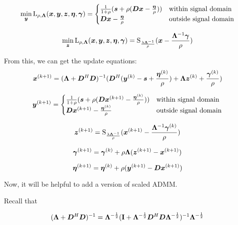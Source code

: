 \documentclass{article}
\begin{document}
\begin{equation}
\min_{\bm{y}} \operatorname{L}_{\rho,\bm{\Lambda}}(\bm{x},\bm{y},\bm{z},\bm{\eta},\bm{\gamma}) = \begin{cases}
\frac{1}{1 + \rho}(\bm{s} + \rho(\bm{D}\bm{x} - \frac{\bm{\eta}}{\rho})) & \text{within signal domain}\\
\bm{D}\bm{x} - \frac{\bm{\eta}}{\rho} & \text{outside signal domain}
\end{cases}
\end{equation}

\begin{equation}
\min_{\bm{z}} \operatorname{L}_{\rho,\bm{\Lambda}}(\bm{x},\bm{y},\bm{z},\bm{\eta},\bm{\gamma}) = \operatorname{S}_{\frac{\lambda\bm{\Lambda}^{-1}}{\rho}}(\bm{x} - \frac{\bm{\Lambda}^{-1}\bm{\gamma}}{\rho})
\end{equation}

From this, we can get the update equations:
\begin{equation}
\bm{x}^{(k + 1)} = (\bm{\Lambda} + \bm{D}^H\bm{D})^{-1}(\bm{D}^H(\bm{y}^{(k)} - \bm{s} + \frac{\bm{\eta}^{(k)}}{\rho}) + \bm{\Lambda}\bm{z}^{(k)} + \frac{\bm{\gamma}^{(k)}}{\rho})
\end{equation}

\begin{equation}
\bm{y}^{(k + 1)}= \begin{cases}
\frac{1}{1 + \rho}(\bm{s} + \rho(\bm{D}\bm{x}^{(k + 1)} - \frac{\bm{\eta}^{(k)}}{\rho})) & \text{within signal domain}\\
\bm{D}\bm{x}^{(k + 1)} - \frac{\bm{\eta}^{(k)}}{\rho} & \text{outside signal domain}
\end{cases}
\end{equation}

\begin{equation}
\bm{z}^{(k + 1)}= \operatorname{S}_{\frac{\lambda\bm{\Lambda}^{-1}}{\rho}}(\bm{x}^{(k + 1)} - \frac{\bm{\Lambda}^{-1}\bm{\gamma}^{(k)}}{\rho})
\end{equation}

\begin{equation}
\bm{\gamma}^{(k + 1)} = \bm{\gamma}^{(k)} + \rho\bm{\Lambda}(\bm{z}^{(k + 1)} - \bm{x}^{(k + 1)})
\end{equation}

\begin{equation}
\bm{\eta}^{(k + 1)} = \bm{\eta}^{(k)} + \rho(\bm{y}^{(k + 1)} - \bm{D}\bm{x}^{(k + 1)})
\end{equation}

Now, it will be helpful to add a version of scaled ADMM.

Recall that

\begin{equation}
(\bm{\Lambda} + \bm{D}^H\bm{D})^{-1} = \bm{\Lambda}^{-\frac{1}{2}}({\bf I} + \bm{\Lambda}^{-\frac{1}{2}}\bm{D}^H\bm{D}\bm{\Lambda}^{-\frac{1}{2}})^{-1}\bm{\Lambda}^{-\frac{1}{2}}
\end{equation}
\end{document}
